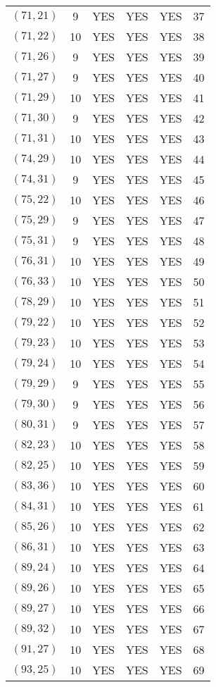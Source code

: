 \begin{longtable}{|c|c|c|c|c|c|}
$(71, 21)$ & 9 & YES & YES & YES & 37\\
$(71, 22)$ & 10 & YES & YES & YES & 38\\
$(71, 26)$ & 9 & YES & YES & YES & 39\\
$(71, 27)$ & 9 & YES & YES & YES & 40\\
$(71, 29)$ & 10 & YES & YES & YES & 41\\
$(71, 30)$ & 9 & YES & YES & YES & 42\\
$(71, 31)$ & 10 & YES & YES & YES & 43\\
$(74, 29)$ & 10 & YES & YES & YES & 44\\
$(74, 31)$ & 9 & YES & YES & YES & 45\\
$(75, 22)$ & 10 & YES & YES & YES & 46\\
$(75, 29)$ & 9 & YES & YES & YES & 47\\
$(75, 31)$ & 9 & YES & YES & YES & 48\\
$(76, 31)$ & 10 & YES & YES & YES & 49\\
$(76, 33)$ & 10 & YES & YES & YES & 50\\
$(78, 29)$ & 10 & YES & YES & YES & 51\\
$(79, 22)$ & 10 & YES & YES & YES & 52\\
$(79, 23)$ & 10 & YES & YES & YES & 53\\
$(79, 24)$ & 10 & YES & YES & YES & 54\\
$(79, 29)$ & 9 & YES & YES & YES & 55\\
$(79, 30)$ & 9 & YES & YES & YES & 56\\
$(80, 31)$ & 9 & YES & YES & YES & 57\\
$(82, 23)$ & 10 & YES & YES & YES & 58\\
$(82, 25)$ & 10 & YES & YES & YES & 59\\
$(83, 36)$ & 10 & YES & YES & YES & 60\\
$(84, 31)$ & 10 & YES & YES & YES & 61\\
$(85, 26)$ & 10 & YES & YES & YES & 62\\
$(86, 31)$ & 10 & YES & YES & YES & 63\\
$(89, 24)$ & 10 & YES & YES & YES & 64\\
$(89, 26)$ & 10 & YES & YES & YES & 65\\
$(89, 27)$ & 10 & YES & YES & YES & 66\\
$(89, 32)$ & 10 & YES & YES & YES & 67\\
$(91, 27)$ & 10 & YES & YES & YES & 68\\
$(93, 25)$ & 10 & YES & YES & YES & 69\\

\end{longtable}
